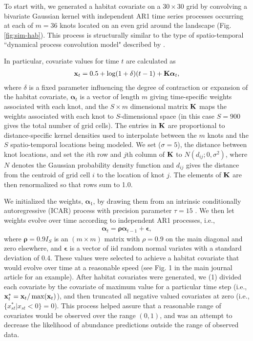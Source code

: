 \documentclass[12pt,fleqn]{article}
\begin{document}
\begin{flushleft}
To start with, we generated a habitat covariate on a $30 \times 30$ grid by convolving a bivariate Gaussian kernel with independent AR1 time series processes occurring at each of $m=36$ knots located on an even grid around the landscape (Fig. \ref{fig:sim-hab}).  This process is structurally similar to the type of spatio-temporal ``dynamical process convolution model" described by \citet{CalderEtAl2002}.



\hspace{.5in} In particular, covariate values for time $t$ are calculated as
\begin{eqnarray*}
  {\bf x}_t = 0.5 + \log(1+\delta) (t-1) + {\bf K}\boldsymbol{\alpha}_t,
\end{eqnarray*}
where $\delta$ is a fixed parameter influencing the degree of contraction or expansion of the habitat covariate, $\boldsymbol{\alpha}_t$ is a vector of length $m$ giving time-specific weights associated with each knot, and the $S \times m$ dimensional matrix ${\bf K}$ maps the weights associated with each knot to $S$-dimensional space (in this case $S=900$ gives the total number of grid cells).  The entries in ${\bf K}$ are proportional to distance-specific kernel densities used to interpolate between the $m$ knots and the $S$ spatio-temporal locations being modeled.  We set ($\sigma=5$), the distance between knot locations, and set the $i$th row and $j$th column of ${\bf K}$ to $N(d_{ij}; 0,\sigma^2)$, where $N$ denotes the Gaussian probability density function and $d_{ij}$ gives the distance from the centroid of grid cell $i$ to the location of knot $j$.  The elements of ${\bf K}$ are then renormalized so that rows sum to 1.0.

\hspace{.5in} We initialized the weights, $\boldsymbol{\alpha}_1$, by drawing them from an intrinsic conditionally autoregressive (ICAR) process with precision parameter $\tau = 15$ \citep[see e.g.,][]{RueHeld2005}.  We then let weights evolve over time according to independent AR1 processes, i.e.,
\begin{eqnarray}
  \boldsymbol{\alpha}_t = \boldsymbol{\rho} \boldsymbol{\alpha}_{t-1} + \boldsymbol{\epsilon},
  \label{eq:alpha}
\end{eqnarray}
where $\boldsymbol{\rho}=0.9 I_S$ is an $(m \times m)$ matrix with $\rho = 0.9$ on the main diagonal and zero elsewhere, and $\boldsymbol{\epsilon}$ is a vector of iid random normal variates with a standard deviation of 0.4.  These values were selected to achieve a habitat covariate that would evolve over time at a reasonable speed (see Fig. 1 in the main journal article for an example).  After habitat covariates were generated, we (1) divided each covariate by the covariate of maximum value for a particular time step (i.e., ${\bf x}_t^* = {\bf x}_t / \max ({\bf x}_t)$), and then truncated all negative valued covariates at zero (i.e., $\{ x_{st}^* | x_{st} < 0 \} = 0$).  This process helped assure that a reasonable range of covariates would be observed over the range $(0,1)$, and was an attempt to decrease the likelihood of abundance predictions outside the range of observed data.


\end{flushleft}
\end{document}
